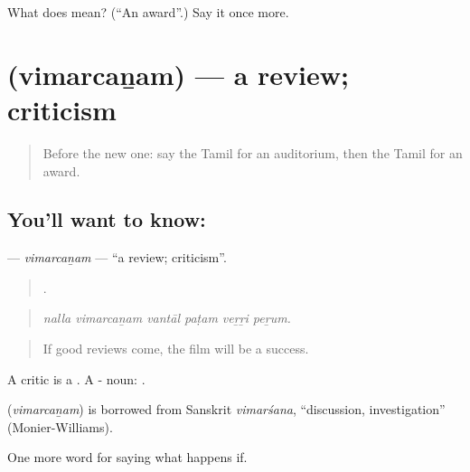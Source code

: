 \begin{tcolorbox}[breakable,colback=teal!4,colframe=teal!35!black,title={Before you move on}]
What does  mean? (\textquotedblleft{}An award\textquotedblright{}.) Say it once more.
\end{tcolorbox}
\section[\texorpdfstring{\ta{விமர்சனம்} (vimarcaṉam)}{விமர்சனம் (vimarcaṉam)}]{ (vimarcaṉam) — a review; criticism}

\label{lesson:TA-C555-vimarcanam}



\begin{quote}
Before the new one: say the Tamil for an auditorium, then the Tamil for an award.
\end{quote}

\subsection*{You'll want to know: }
\textbf{} — \emph{vimarcaṉam} — \textquotedblleft{}a review; criticism\textquotedblright{}.

\begin{quote}
     .
\end{quote}

\begin{quote}
\emph{nalla vimarcaṉam vantāl paṭam veṟṟi peṟum.}
\end{quote}

\begin{quote}
If good reviews come, the film will be a success.
\end{quote}

A critic is a . A - noun: .

\begin{cousinweb}
\textbf{} (\emph{vimarcaṉam}) is borrowed from Sanskrit \emph{vimarśana}, \textquotedblleft{}discussion, investigation\textquotedblright{} (Monier-Williams).
\end{cousinweb}

\begin{grammarlens}[title={What you've built}]
One more word for saying what happens if.
\end{grammarlens}

